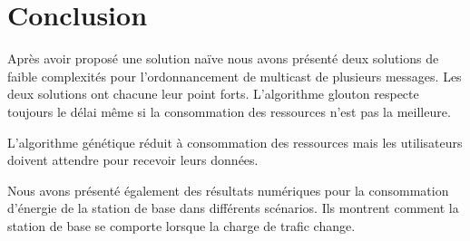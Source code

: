 \documentclass[runningheads]{llncs}
\begin{document}




\section*{Conclusion}
Après avoir proposé une solution naïve nous avons présent\'e deux 
solutions de faible complexités 
pour l'ordonnancement de multicast de plusieurs messages.
Les deux solutions ont chacune leur point forts.
L'algorithme glouton respecte toujours le délai même si 
la consommation des ressources n'est pas la meilleure.

L'algorithme génétique réduit à consommation des ressources 
mais les utilisateurs doivent attendre pour recevoir leurs données.

Nous avons présent\'e également des résultats numériques pour la 
consommation d'énergie de la station de base dans différents scénarios.
Ils montrent comment la station de base se comporte lorsque la charge de trafic change.


\end{document}
